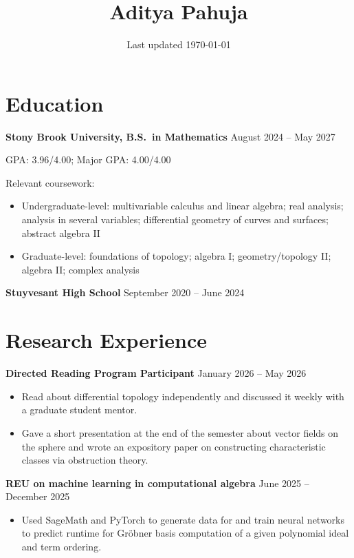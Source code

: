 \documentclass[10pt]{article}
\title{Aditya Pahuja\vspace{-1em}}
\date{\normalsize Last updated \today}
\providecommand{\ii}{\item}
\begin{document}
\maketitle

\vspace{-3mm}\section*{Education}
\textbf{Stony Brook University, B.S.\ in Mathematics}
\hfill{}August 2024 -- May 2027

GPA: 3.96/4.00; Major GPA: 4.00/4.00
\vspace{1mm}

Relevant coursework:
\begin{itemize}
    \small
    \ii Undergraduate-level:
    multivariable calculus and linear algebra;
    real analysis;
    analysis in several variables;
    differential geometry of curves and surfaces;
    abstract algebra II
    \ii Graduate-level:
    foundations of topology;
    algebra I;
    geometry/topology II;
    algebra II;
    complex analysis
\end{itemize}

\textbf{Stuyvesant High School}
\hfill{}September 2020 -- June 2024

\vspace{-3mm}\section*{Research Experience}

\textbf{Directed Reading Program Participant}
\hfill{}January 2026 -- May 2026
\begin{itemize}
    \ii Read about differential topology independently
    and discussed it weekly with a graduate student mentor.
    \ii Gave a short presentation at the end of the semester
    about vector fields on the sphere and wrote an expository paper
    on constructing characteristic classes via obstruction theory.
\end{itemize}

\textbf{REU on machine learning in computational algebra}
\hfill{}June 2025 -- December 2025
\begin{itemize}
    \ii Used SageMath and PyTorch to generate data for and train neural networks
    to predict runtime for Gröbner basis computation of a given polynomial ideal
    and term ordering.
\end{itemize}
\end{document}

